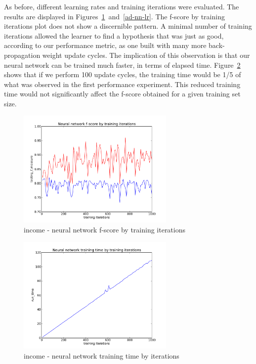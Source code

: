\documentclass{sig-alternate}
\begin{document}
As before, different learning rates and training iterations were evaluated. The results are displayed in Figures~\ref{ad-nn-ti}~and~\ref{ad-nn-lr}. The f-score by training iterations plot does not show a discernible pattern. A minimal number of training iterations allowed the learner to find a hypothesis that was just as good, according to our performance metric, as one built with many more back-propagation weight update cycles. The implication of this observation is that our neural network can be trained much faster, in terms of elapsed time. Figure~\ref{ad-nn-time} shows that if we perform 100 update cycles, the training time would be 1/5 of what was observed in the first performance experiment. This reduced training time would not significantly affect the f-score obtained for a given training set size.

\begin{figure}[!htbp]
    \centering
    \includegraphics[width=3in]{data/adult/perceptron/training-iterations.pdf}
    \caption{income - neural network f-score by training iterations \label{ad-nn-ti}}
\end{figure} 

\begin{figure}[!htbp]
    \centering
    \includegraphics[width=3in]{data/adult/perceptron/time-iterations.pdf}
    \caption{income - neural network training time  by iterations \label{ad-nn-time}}
\end{figure} 
\end{document}
